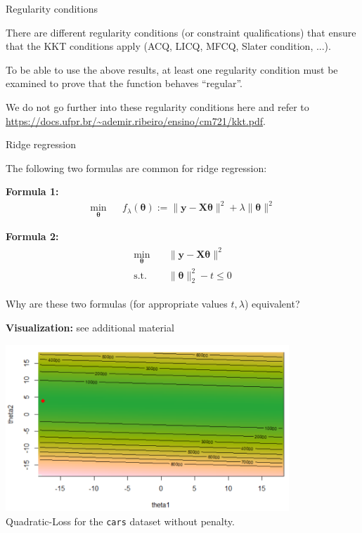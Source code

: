 \begin{vbframe}{Regularity conditions}

There are different regularity conditions (or constraint qualifications) that ensure that the KKT conditions apply (ACQ, LICQ, MFCQ, Slater condition, ...).

\lz

To be able to use the above results, at least one regularity condition must be examined to prove that the function behaves \enquote{regular}.

\lz

We do not go further into these regularity conditions here and refer to \url{https://docs.ufpr.br/~ademir.ribeiro/ensino/cm721/kkt.pdf}.

\end{vbframe}

\begin{vbframe}{Ridge regression}

The following two formulas are common for ridge regression:

\lz
\textbf{Formula 1:}
\begin{eqnarray}
  \min_{\bm{\theta}} && f_\lambda(\bm{\theta}) := \|\bm{y} - \mathbf{X}\bm{\theta}\|^2 + \lambda \|\bm{\theta}\|^2
\label{eq:form1}
\end{eqnarray}

\vspace*{-0.2cm}
\textbf{Formula 2:}
\begin{align}
\begin{split}
\min_{\bm{\theta}} & \quad \|\bm{y} - \mathbf{X}\bm{\theta}\|^2 \\
\text{s.t. } & \quad \|\bm{\theta}\|_2^2 - t \le 0
\end{split}
\label{eq:form2}
\end{align}



Why are these two formulas (for appropriate values $t, \lambda$) equivalent?

\framebreak

\textbf{Visualization:} see additional material

\lz

\begin{center}
\includegraphics[width = 0.8\textwidth]{figure_man/ridge_original.png} \\
Quadratic-Loss for the \texttt{cars} dataset without penalty.
\end{center}


\end{vbframe}
